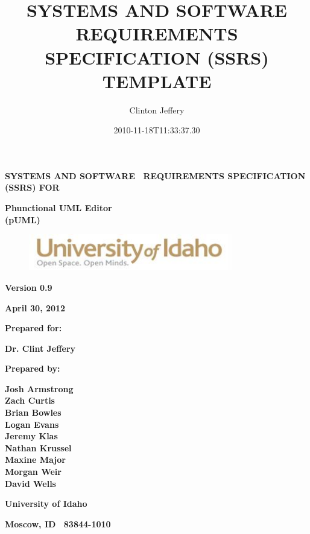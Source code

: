 \documentclass[twoside,letterpaper]{article}
\title{SYSTEMS AND SOFTWARE REQUIREMENTS SPECIFICATION (SSRS) TEMPLATE}
\author{Clinton Jeffery}
\date{2010-11-18T11:33:37.30}
\begin{document}
\clearpage
{\centering\bfseries
SYSTEMS AND SOFTWARE \ REQUIREMENTS SPECIFICATION (SSRS) FOR
\par}


\bigskip

{\centering\bfseries
Phunctional UML Editor
\\(pUML)
\par}


\bigskip


\bigskip


\bigskip

\begin{figure}
\centering
\includegraphics[width=3.5in]{uidahologo.jpg}
\end{figure}

\bigskip


\bigskip

{\centering\bfseries
Version 0.9
\par}

{\centering\bfseries
April 30, 2012
\par}


\bigskip


\bigskip

{\centering\bfseries
Prepared for:
\par}
{\centering\bfseries
Dr. Clint Jeffery
\par}

\bigskip


\bigskip

{\centering\bfseries
Prepared by:
\par}

{\centering\bfseries
Josh Armstrong
\\Zach Curtis
\\Brian Bowles
\\Logan Evans
\\Jeremy Klas
\\Nathan Krussel
\\Maxine Major
\\Morgan Weir
\\David Wells
\par}

{\centering\bfseries
University of Idaho
\par}

{\centering\bfseries
Moscow, ID \ 83844-1010
\par}
\end{document}
